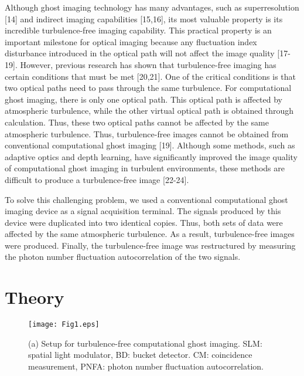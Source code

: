 \documentclass[letterpaper,10pt]{article}
\begin{document}
Although ghost imaging technology has many advantages, such as
superresolution [14] and indirect imaging capabilities [15,16], its most valuable property is its incredible
turbulence-free imaging capability. This practical property is an important
milestone for optical imaging because any fluctuation index disturbance
introduced in the optical path will not affect the image quality [17-19]. However, previous research has shown that
turbulence-free imaging has certain conditions that must be met [20,21]. One of the critical conditions is that two optical paths
need to pass through the same turbulence. For computational ghost imaging,
there is only one optical path. This optical path is affected by atmospheric
turbulence, while the other virtual optical path is obtained through
calculation. Thus, these two optical paths cannot be affected by the same
atmospheric turbulence. Thus, turbulence-free images cannot be obtained from
conventional computational ghost imaging [19]. Although some
methods, such as adaptive optics and depth learning, have significantly
improved the image quality of computational ghost imaging in turbulent
environments, these methods are difficult to produce a turbulence-free
image [22-24].

To solve this challenging problem, we used a conventional computational
ghost imaging device as a signal acquisition terminal. The signals produced
by this device were duplicated into two identical copies. Thus, both sets of
data were affected by the same atmospheric turbulence. As a result,
turbulence-free images were produced. Finally, the turbulence-free image was
restructured by measuring the photon number fluctuation autocorrelation of
the two signals.

\section{Theory}

\begin{figure}[h]
\centering\texttt{[image: Fig1.eps]}
\caption{(a) Setup for turbulence-free computational ghost imaging. SLM:
spatial light modulator, BD: bucket detector. CM: coincidence measurement,
PNFA: photon number fluctuation autocorrelation.}
\end{figure}
\end{document}
